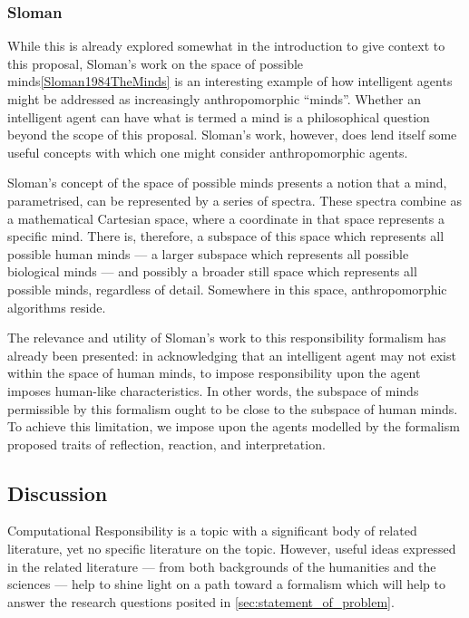 \subsubsection{Sloman}\label{subsec:space-of-minds}
While this is already explored somewhat in the introduction to give context to this proposal, Sloman's work on the space of possible minds\cref{Sloman1984TheMinds} is an interesting example of how intelligent agents might be addressed as increasingly anthropomorphic ``minds''. Whether an intelligent agent can have what is termed a mind is a philosophical question beyond the scope of this proposal. Sloman's work, however, does lend itself some useful concepts with which one might consider anthropomorphic agents.\par 

Sloman's concept of the space of possible minds presents a notion that a mind, parametrised, can be represented by a series of spectra. These spectra combine as a mathematical Cartesian space, where a coordinate in that space represents a specific mind. There is, therefore, a subspace of this space which represents all possible human minds --- a larger subspace which represents all possible biological minds --- and possibly a broader still space which represents all possible minds, regardless of detail. Somewhere in this space, anthropomorphic algorithms reside.\par

The relevance and utility of Sloman's work to this responsibility formalism has already been presented: in acknowledging that an intelligent agent may not exist within the space of human minds, to impose responsibility upon the agent imposes human-like characteristics. In other words, the subspace of minds permissible by this formalism ought to be close to the subspace of human minds. To achieve this limitation, we impose upon the agents modelled by the formalism proposed traits of reflection, reaction, and interpretation.\par

\subsection{Discussion}
Computational Responsibility is a topic with a significant body of related literature, yet no specific literature on the topic. However, useful ideas expressed in the related literature --- from both backgrounds of the humanities and the sciences --- help to shine light on a path toward a formalism which will help to answer the research questions posited in \cref{sec:statement_of_problem}.\par

